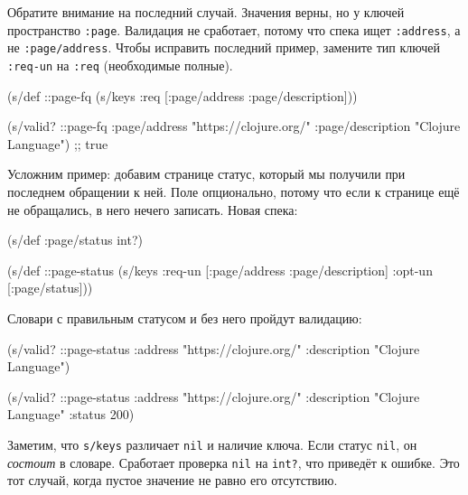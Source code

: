Обратите внимание на последний случай. Значения верны, но у ключей пространство
\verb|:page|. Валидация не сработает, потому что спека ищет \verb|:address|,
а не \verb|:page/address|. Чтобы исправить последний пример, замените тип
ключей \verb|:req-un| на \verb|:req| (необходимые полные).


\begin{english}
  \begin{clojure}
(s/def ::page-fq
  (s/keys :req [:page/address
                :page/description]))

(s/valid? ::page-fq
          {:page/address "https://clojure.org/"
           :page/description "Clojure Language"})
;; true
  \end{clojure}
\end{english}

Усложним пример: добавим странице статус, который мы получили при
последнем обращении к ней. Поле опционально, потому что если к странице ещё не
обращались, в него нечего записать. Новая спека:

\begin{english}
  \begin{clojure}
(s/def :page/status int?)

(s/def ::page-status
  (s/keys :req-un [:page/address
                   :page/description]
          :opt-un [:page/status]))
  \end{clojure}
\end{english}

\noindent
Словари с правильным статусом и без него пройдут валидацию:

\begin{english}
  \begin{clojure}
(s/valid? ::page-status
          {:address "https://clojure.org/"
           :description "Clojure Language"})

(s/valid? ::page-status
          {:address "https://clojure.org/"
           :description "Clojure Language"
           :status 200})
  \end{clojure}
\end{english}


Заметим, что \verb|s/keys| различает \verb|nil| и наличие ключа. Если статус
\verb|nil|, он \emph{состоит} в словаре. Сработает проверка \verb|nil| на
\verb|int?|, что приведёт к ошибке. Это тот случай, когда пустое значение
не равно его отсутствию.

